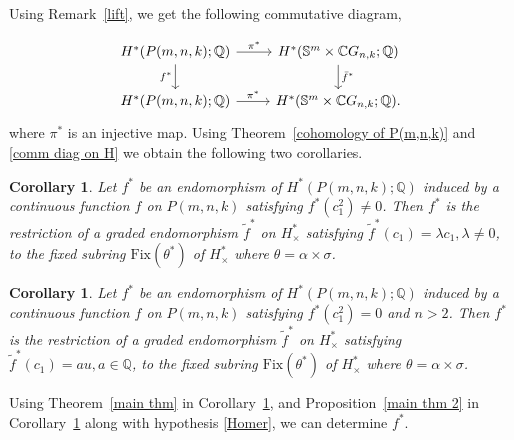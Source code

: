 \documentclass{amsart}
\newtheorem{corollary}[theorem]{Corollary}
\newcommand{\thmref}[1]{Theorem~\ref{#1}}
\newcommand{\propref}[1]{Proposition~\ref{#1}}
\newcommand{\corref}[1]{Corollary~\ref{#1}}
\newcommand{\remref}[1]{Remark~\ref{#1}}
\begin{document}
	Using \remref{lift}, we get the following commutative %
diagram,
	
	\begin{equation}\label{comm diag on H}
		\begin{tikzcd}
			{H^*(P(m,n,k);\mathbb Q)}  & {H^*(\mathbb S^m\times \mathbb CG_{n,k};\mathbb Q)} \\
			{H^*(P(m,n,k);\mathbb Q)} & {H^*(\mathbb S^m\times \mathbb CG_{n,k};\mathbb Q).}
			\arrow["{\pi^*}", from=1-1, to=1-2]
			\arrow["{f^*}"', from=1-1, to=2-1]
			\arrow["{\bar f^*}", from=1-2, to=2-2]
			\arrow["{\pi^*}", from=2-1, to=2-2]
		\end{tikzcd}
	\end{equation}
	where $\pi^*$ is an injective map. Using \thmref{cohomology of P(m,n,k)} and \eqref{comm diag on H} we obtain the following two corollaries. 
	\begin{corollary}\label{cor3}
		Let %
$f^*$ be an endomorphism of $H^*(P(m,n,k); \mathbb{Q})$ induced by a continuous function $f$ on $P(m,n,k)$ satisfying $f^*(c_1^2) \ne 0$. Then
		$f^*$ is the restriction of a graded endomorphism $\tilde{f}^*$ on  $H^*_\times$ satisfying $\tilde{f}^*(c_1) = \lambda c_1, \lambda \neq 0$,  to the fixed subring $\mathrm{Fix}(\theta^*)$ %
of $H^*_\times$ where %
$\theta = \alpha\times \sigma$.
	\end{corollary}
	\begin{corollary}\label{cor4}
		Let $f^*$ be an endomorphism of $H^*(P(m,n,k); \mathbb{Q})$ induced by a continuous function $f$ on $P(m,n,k)$ satisfying $f^*(c_1^2) =0$ and $n>2$. Then
		$f^*$ is the restriction of a graded endomorphism $\tilde{f}^*$ on  $H^*_\times$ satisfying $\tilde{f}^*(c_1) = au, a \in \mathbb{Q}$,  to the fixed subring $\mathrm{Fix}(\theta^*)$ %
of $H^*_\times$ where %
$\theta = \alpha\times \sigma$.
	\end{corollary}
	Using \thmref{main thm} in \corref{cor3}, and \propref{main thm 2} in \corref{cor4} along with hypothesis \eqref{Homer}, we can determine $f^*$.
	
\end{document}
